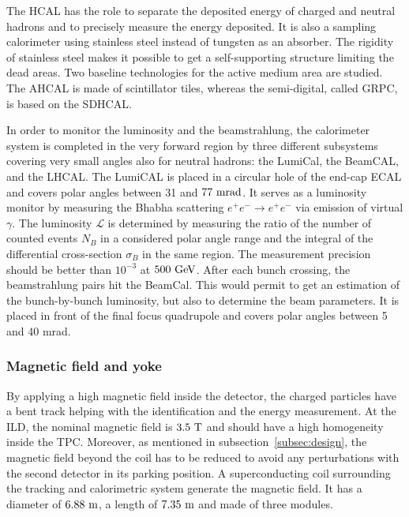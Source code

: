       The \gls{HCAL} has the role to separate the deposited energy of charged and neutral hadrons and to precisely measure the energy deposited.
      It is also a sampling calorimeter using stainless steel instead of tungsten as an absorber. 
      The rigidity of stainless steel makes it possible to get a self-supporting structure limiting the dead areas.
      Two baseline technologies for the active medium area are studied.
      The  \gls{AHCAL} is made of scintillator tiles, whereas the semi-digital, called \gls{GRPC}, is based on the \gls{SDHCAL}.

      In order to monitor the luminosity and the beamstrahlung, the calorimeter system is completed in the very forward region by three different subsystems covering very small angles also for neutral hadrons: the LumiCal, the BeamCAL, and the \gls{LHCAL}.
      The LumiCAL is placed in a circular hole of the end-cap \gls{ECAL} and covers polar angles between 31 and $77~\rm{mrad}$. 
      It serves as a luminosity monitor by measuring the Bhabha scattering $e^+e^- \rightarrow e^+e^-$ via emission of virtual $\gamma$.
      The luminosity $\mathcal{L}$ is determined by measuring  the ratio of the number of counted events $N_B$ in a considered polar angle range and the integral of the differential cross-section $\sigma_B$ in the same region.
      The measurement precision should be better than $10^{-3}$ at $500~\rm{GeV}$.
      After each bunch crossing, the beamstrahlung pairs hit the BeamCal.
      This would permit to get an estimation of the bunch-by-bunch luminosity, but also to determine the beam parameters.
      It is placed in front of the final focus quadrupole and covers polar angles between 5 and 40 mrad.

      \subsubsection{Magnetic field and yoke}

     By applying a high magnetic field inside the detector, the charged particles have a bent track helping with the identification and the energy measurement.
     At the \gls{ILD}, the nominal magnetic field is $3.5~\rm{T}$ and should have a high homogeneity inside the TPC.
     Moreover, as mentioned in subsection~\ref{subsec:design}, the magnetic field beyond the coil has to be reduced to avoid any perturbations with the second detector in its parking position.
     A superconducting coil surrounding the tracking and calorimetric system generate the magnetic field.
     It has a diameter of $6.88~\rm{m}$, a length of $7.35~\rm{m}$ and made of three modules.

